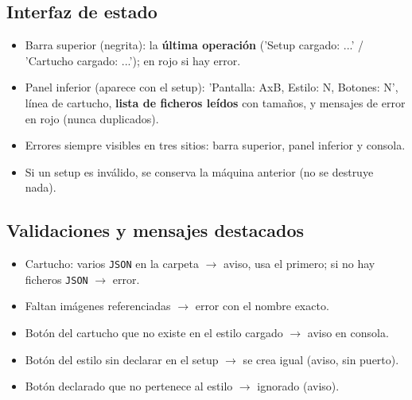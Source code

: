 	\subsection{Interfaz de estado}
	
	\begin{itemize}
		\item Barra superior (negrita): la \textbf{última operación} ('Setup cargado: ...' / 'Cartucho cargado: ...'); en rojo si hay error.
		\item Panel inferior (aparece con el setup): 'Pantalla: AxB, Estilo: N, Botones: N', línea de cartucho, \textbf{lista de ficheros leídos} con tamaños, y mensajes de error en rojo (nunca duplicados).
		\item Errores siempre visibles en tres sitios: barra superior, panel inferior y consola.
		\item Si un setup es inválido, se conserva la máquina anterior (no se destruye nada).
	\end{itemize}
	
	\subsection{Validaciones y mensajes destacados}
	
	\begin{itemize}
		\item Cartucho: varios \texttt{JSON} en la carpeta $\rightarrow$ aviso, usa el primero; si no hay ficheros \texttt{JSON} $\rightarrow$ error.
		\item Faltan imágenes referenciadas $\rightarrow$ error con el nombre exacto.
		\item Botón del cartucho que no existe en el estilo cargado $\rightarrow$ aviso en consola.
		\item Botón del estilo sin declarar en el setup $\rightarrow$ se crea igual (aviso, sin puerto).
		\item Botón declarado que no pertenece al estilo $\rightarrow$ ignorado (aviso).
	\end{itemize}
	
	\clearpage